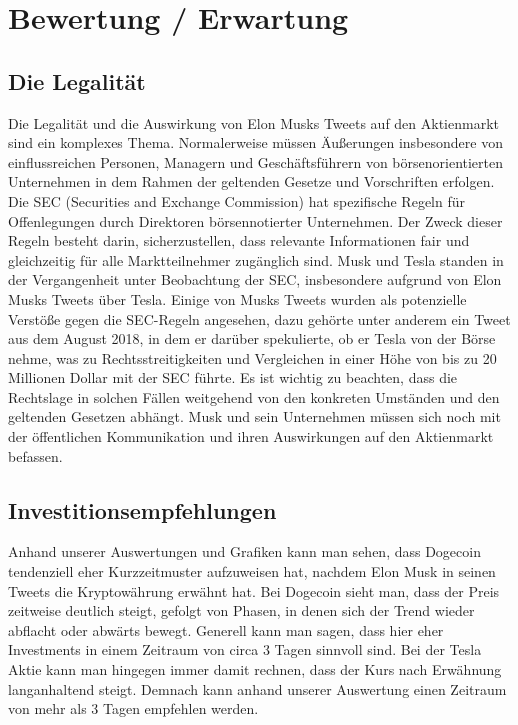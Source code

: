 \documentclass{article}
\begin{document}
\newpage

\section{Bewertung / Erwartung} \label{Bewertung / Erwartung}

\subsection{Die Legalität} \label{Die Legalität}
Die Legalität und die Auswirkung von Elon Musks Tweets auf den Aktienmarkt sind ein komplexes Thema.
Normalerweise müssen Äußerungen insbesondere von einflussreichen Personen, Managern und Geschäftsführern von börsenorientierten Unternehmen in dem Rahmen der geltenden Gesetze und Vorschriften erfolgen.
Die SEC (Securities and Exchange Commission) hat spezifische Regeln für Offenlegungen durch Direktoren börsennotierter Unternehmen.
Der Zweck dieser Regeln besteht darin, sicherzustellen, dass relevante Informationen fair und gleichzeitig für alle Marktteilnehmer zugänglich sind.
Musk und Tesla standen in der Vergangenheit unter Beobachtung der SEC, insbesondere aufgrund von Elon Musks Tweets über Tesla.
Einige von Musks Tweets wurden als potenzielle Verstöße gegen die SEC-Regeln angesehen, dazu gehörte unter anderem ein Tweet aus dem August 2018, in dem er darüber spekulierte, ob er Tesla von der Börse nehme, was zu Rechtsstreitigkeiten und Vergleichen in einer Höhe von bis zu 20 Millionen Dollar mit der SEC führte. Es ist wichtig zu beachten, dass die Rechtslage in solchen Fällen weitgehend von den konkreten Umständen und den geltenden Gesetzen abhängt.
Musk und sein Unternehmen müssen sich noch mit der öffentlichen Kommunikation und ihren Auswirkungen auf den Aktienmarkt befassen.

\subsection{Investitionsempfehlungen} \label{Investitionsempfehlungen}
Anhand unserer Auswertungen und Grafiken kann man sehen, dass Dogecoin tendenziell eher Kurzzeitmuster aufzuweisen hat, nachdem Elon Musk in seinen Tweets die Kryptowährung erwähnt hat.
Bei Dogecoin sieht man, dass der Preis zeitweise deutlich steigt, gefolgt von Phasen, in denen sich der Trend wieder abflacht oder abwärts bewegt.
Generell kann man sagen, dass hier eher Investments in einem Zeitraum von circa 3 Tagen sinnvoll sind.
Bei der Tesla Aktie kann man hingegen immer damit rechnen, dass der Kurs nach Erwähnung langanhaltend steigt.
Demnach kann anhand unserer Auswertung einen Zeitraum von mehr als 3 Tagen empfehlen werden.
\end{document}
